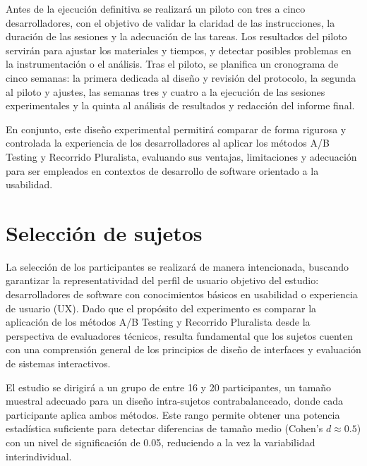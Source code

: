 \documentclass[a4paper,12pt]{report}
\begin{document}
Antes de la ejecución definitiva se realizará un piloto con tres a cinco desarrolladores, con el objetivo de validar la claridad de las instrucciones, la duración de las sesiones y la adecuación de las tareas. Los resultados del piloto servirán para ajustar los materiales y tiempos, y detectar posibles problemas en la instrumentación o el análisis. Tras el piloto, se planifica un cronograma de cinco semanas: la primera dedicada al diseño y revisión del protocolo, la segunda al piloto y ajustes, las semanas tres y cuatro a la ejecución de las sesiones experimentales y la quinta al análisis de resultados y redacción del informe final.

En conjunto, este diseño experimental permitirá comparar de forma rigurosa y controlada la experiencia de los desarrolladores al aplicar los métodos A/B Testing y Recorrido Pluralista, evaluando sus ventajas, limitaciones y adecuación para ser empleados en contextos de desarrollo de software orientado a la usabilidad.


\section{Selección de sujetos}

La selección de los participantes se realizará de manera intencionada, buscando garantizar la representatividad del perfil de usuario objetivo del estudio: desarrolladores de software con conocimientos básicos en usabilidad o experiencia de usuario (UX). Dado que el propósito del experimento es comparar la aplicación de los métodos A/B Testing y Recorrido Pluralista desde la perspectiva de evaluadores técnicos, resulta fundamental que los sujetos cuenten con una comprensión general de los principios de diseño de interfaces y evaluación de sistemas interactivos.

El estudio se dirigirá a un grupo de entre 16 y 20 participantes, un tamaño muestral adecuado para un diseño intra-sujetos contrabalanceado, donde cada participante aplica ambos métodos. Este rango permite obtener una potencia estadística suficiente para detectar diferencias de tamaño medio (Cohen's $d \approx 0.5$) con un nivel de significación de 0.05, reduciendo a la vez la variabilidad interindividual.
\end{document}
